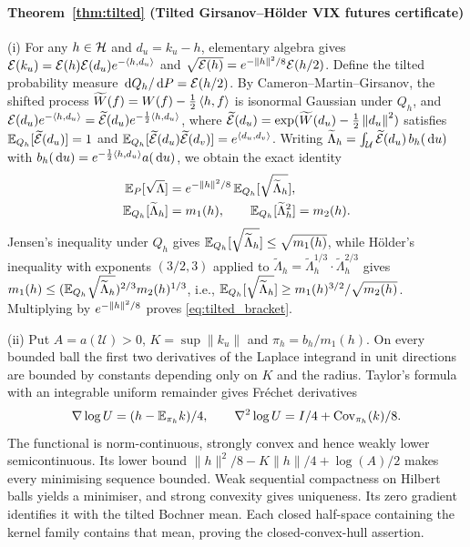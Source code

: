 \paragraph{Theorem~\ref{thm:tilted} (Tilted Girsanov--H\"older VIX futures certificate)}
(i) For any $h\in\mathcal{H}$ and $d_u=k_u-h$, elementary algebra gives
$\mathcal{E}(k_u)=\mathcal{E}(h)\mathcal{E}(d_u)e^{-\left\langle h,d_u\right\rangle}$ and $\sqrt{\mathcal{E}(h)}=e^{-\left\lVert h\right\rVert^2/8}\mathcal{E}(h/2)$. Define the
tilted probability measure $\,\mathrm{d} Q_h/\,\mathrm{d} P=\mathcal{E}(h/2)$. By Cameron--Martin--Girsanov, the shifted process
$\widetilde{W}(f)=W(f)-\tfrac12\left\langle h,f\right\rangle$ is isonormal Gaussian under $Q_h$, and
$\mathcal{E}(d_u)e^{-\left\langle h,d_u\right\rangle}=\widetilde{\mathcal{E}}(d_u)e^{-\frac12\left\langle h,d_u\right\rangle}$, where
$\widetilde{\mathcal{E}}(d_u)=\exp(\widetilde{W}(d_u)-\tfrac12\left\lVert d_u\right\rVert^2)$ satisfies
$\mathbb{E}_{Q_h}[\widetilde{\mathcal{E}}(d_u)]=1$ and $\mathbb{E}_{Q_h}[\widetilde{\mathcal{E}}(d_u)\widetilde{\mathcal{E}}(d_v)]=e^{\left\langle d_u,d_v\right\rangle}$.
Writing $\widetilde{\Lambda}_h=\int_{\mathcal{U}}\widetilde{\mathcal{E}}(d_u)\,b_h(\,\mathrm{d} u)$ with
$b_h(\,\mathrm{d} u)=e^{-\frac12\left\langle h,d_u\right\rangle}a(\,\mathrm{d} u)$, we obtain the exact identity
\[
\begin{aligned}
  \mathbb{E}_P[\sqrt{\Lambda}]&=e^{-\left\lVert h\right\rVert^2/8}\,\mathbb{E}_{Q_h}[\sqrt{\widetilde{\Lambda}_h}],\\
  \mathbb{E}_{Q_h}[\widetilde{\Lambda}_h]&=m_1(h),\qquad \mathbb{E}_{Q_h}[\widetilde{\Lambda}_h^2]=m_2(h).
\end{aligned}
\]
Jensen's inequality under $Q_h$ gives $\mathbb{E}_{Q_h}[\sqrt{\widetilde{\Lambda}_h}]\le\sqrt{m_1(h)}$, while
H\"older's inequality with exponents $(3/2,3)$ applied to
$\widetilde{\Lambda}_h=\widetilde{\Lambda}_h^{1/3}\cdot\widetilde{\Lambda}_h^{2/3}$ gives
$m_1(h)\le(\mathbb{E}_{Q_h}\sqrt{\widetilde{\Lambda}_h})^{2/3} m_2(h)^{1/3}$, i.e.,
$\mathbb{E}_{Q_h}[\sqrt{\widetilde{\Lambda}_h}]\ge m_1(h)^{3/2}/\sqrt{m_2(h)}$. Multiplying by
$e^{-\left\lVert h\right\rVert^2/8}$ proves \eqref{eq:tilted_bracket}.

(ii) Put $A=a(\mathcal U)>0$, $K=\sup\|k_u\|$ and $\pi_h=b_h/m_1(h)$.
On every bounded ball the first two derivatives of the Laplace integrand in unit directions
are bounded by constants depending only on $K$ and the radius. Taylor's formula with an
integrable uniform remainder gives Fr\'echet derivatives
\[
 \nabla\log U=(h-\mathbb{E}_{\pi_h}k)/4,\qquad
 \nabla^2\log U=I/4+\operatorname{Cov}_{\pi_h}(k)/8 .
\]
The functional is norm-continuous, strongly convex and hence weakly lower semicontinuous.
Its lower bound $\|h\|^2/8-K\|h\|/4+\log(A)/2$ makes every minimising sequence bounded.
Weak sequential compactness on Hilbert balls yields a minimiser, and strong convexity gives
uniqueness. Its zero gradient identifies it with the tilted Bochner mean. Each closed
half-space containing the kernel family contains that mean, proving the closed-convex-hull assertion.

